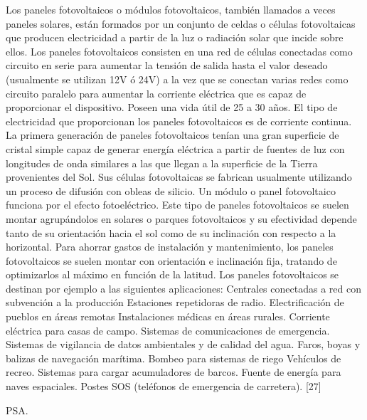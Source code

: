 \documentclass[12pt]{article}
\begin{document}
Los paneles fotovoltaicos o módulos fotovoltaicos, también llamados a veces paneles solares, están formados por un conjunto de celdas o células fotovoltaicas que producen electricidad a partir de la luz o radiación solar que incide sobre ellos.
Los paneles fotovoltaicos consisten en una red de células conectadas como circuito en serie para aumentar la tensión de salida hasta el valor deseado (usualmente se utilizan 12V ó 24V) a la vez que se conectan varias redes como circuito paralelo para aumentar la corriente eléctrica que es capaz de proporcionar el dispositivo. Poseen una vida útil de 25 a 30 años.
El tipo de electricidad que proporcionan los paneles fotovoltaicos es de corriente continua.
La primera generación de paneles fotovoltaicos tenían una gran superficie de cristal simple capaz de generar energía eléctrica a partir de fuentes de luz con longitudes de onda similares a las que llegan a la superficie de la Tierra provenientes del Sol. Sus células fotovoltaicas se fabrican usualmente utilizando un proceso de difusión con obleas de silicio.
Un módulo o panel fotovoltaico funciona por el efecto fotoeléctrico. Este tipo de paneles fotovoltaicos se suelen montar agrupándolos en solares o parques fotovoltaicos y su efectividad depende tanto de su orientación hacia el sol como de su inclinación con respecto a la horizontal. Para ahorrar gastos de instalación y mantenimiento, los paneles fotovoltaicos se suelen montar con orientación e inclinación fija, tratando de optimizarlos al máximo en función de la latitud.
Los paneles fotovoltaicos se destinan por ejemplo a las siguientes aplicaciones:
Centrales conectadas a red con subvención a la producción
Estaciones repetidoras de radio.
Electrificación de pueblos en áreas remotas
Instalaciones médicas en áreas rurales.
Corriente eléctrica para casas de campo.
Sistemas de comunicaciones de emergencia.
Sistemas de vigilancia de datos ambientales y de calidad del agua.
Faros, boyas y balizas de navegación marítima.
Bombeo para sistemas de riego
Vehículos de recreo.
Sistemas para cargar acumuladores de barcos.
Fuente de energía para naves espaciales.
Postes SOS (teléfonos de emergencia de carretera). [27]



PSA.
\end{document}
